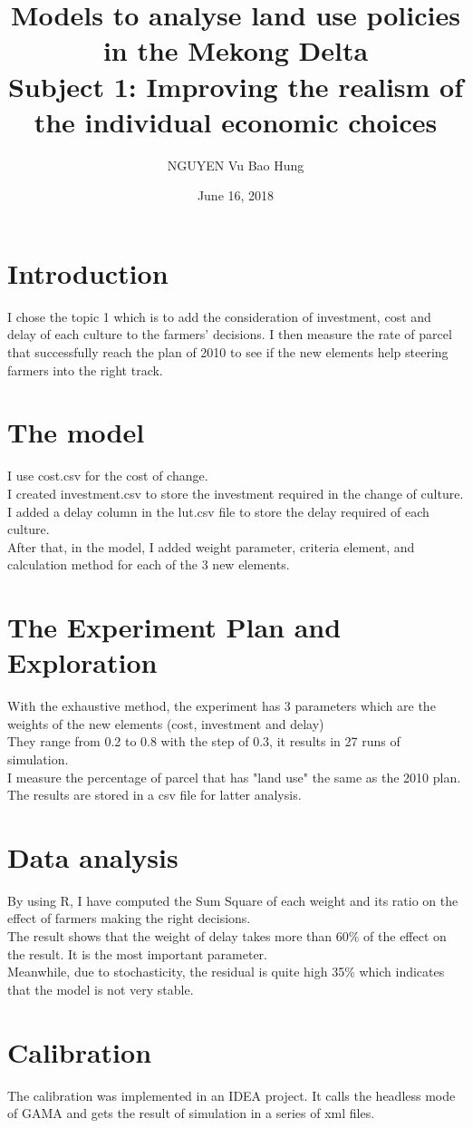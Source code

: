 \documentclass{article}
\title{%
  Models to analyse land use policies in the Mekong Delta \\
  \large Subject 1: Improving the realism of the individual economic choices}
\author{NGUYEN Vu Bao Hung}
\date{June 16, 2018}
\begin{document}
\maketitle

\section{Introduction}
I chose the topic 1 which is to add the consideration of investment, cost and delay of each culture to the farmers' decisions. I then measure the rate of parcel that successfully reach the plan of 2010 to see if the new elements help steering farmers into the right track.

\section{The model}
I use cost.csv for the cost of change.\\
I created investment.csv to store the investment required in the change of culture.\\
I added a delay column in the lut.csv file to store the delay required of each culture.\\
After that, in the model, I added weight parameter, criteria element, and calculation method for each of the 3 new elements.

\section{The Experiment Plan and Exploration}
With the exhaustive method, the experiment has 3 parameters which are the weights of the new elements (cost, investment and delay)\\
They range from 0.2 to 0.8 with the step of 0.3, it results in 27 runs of simulation.\\
I measure the percentage of parcel that has "land use" the same as the 2010 plan.\\
The results are stored in a csv file for latter analysis.

\section{Data analysis}
By using R, I have computed the Sum Square of each weight and its ratio on the effect of farmers making the right decisions.\\
The result shows that the weight of delay takes more than 60\% of the effect on the result. It is the most important parameter.\\
Meanwhile, due to stochasticity, the residual is quite high 35\% which indicates that the model is not very stable.

\section{Calibration}
The calibration was implemented in an IDEA project. It calls the headless mode of GAMA and gets the result of simulation in a series of xml files.
\end{document}
